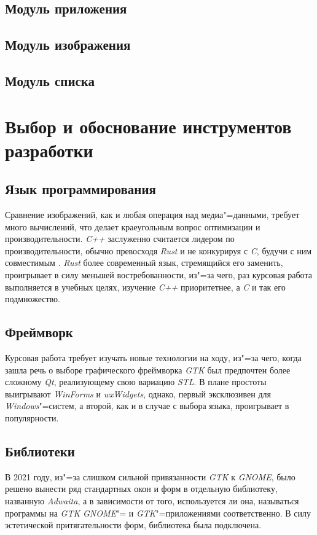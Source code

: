 \documentclass[variant=courcework]{bsuir}
\begin{document}
\subsection{Модуль приложения}

\subsection{Модуль изображения}

\subsection{Модуль списка}

\section{Выбор и обоснование инструментов разработки}

\subsection{Язык программирования}
Сравнение изображений, как и любая операция над медиа"=данными, требует много
вычислений, что делает краеугольным вопрос оптимизации и производительности.
\textit{C++} заслуженно считается лидером по производительности, обычно
превосходя \textit{Rust} и не конкурируя с \textit{C}, будучи с ним совместимым
\cite{benchmarksgame}. \textit{Rust} более современный язык, стремящийся его
заменить, проигрывает в силу меньшей востребованности, из"=за чего, раз курсовая
работа выполняется в учебных целях, изучение \textit{C++} приоритетнее, а
\textit{C} и так его подмножество.

\subsection{Фреймворк}
Курсовая работа требует изучать новые технологии на ходу, из"=за чего, когда
зашла речь о выборе графического фреймворка \textit{GTK} был предпочтен более
сложному \textit{Qt}, реализующему свою вариацию \textit{STL}. В плане простоты
выигрывают \textit{WinForms} и \textit{wxWidgets}, однако, первый эксклюзивен
для \textit{Windows}"=систем, а второй, как и в случае с выбора языка,
проигрывает в популярности.

\subsection{Библиотеки}
В 2021 году, из"=за слишком сильной привязанности \textit{GTK} к \textit{GNOME},
было решено вынести ряд стандартных окон и форм в отдельную библиотеку,
названную \textit{Adwaita}, а в зависимости от того, используется ли она,
называться программы на \textit{GTK} \textit{GNOME}"= и
\textit{GTK}"=приложениями соответственно. В силу эстетической притягательности
форм, библиотека была подключена.
\end{document}
